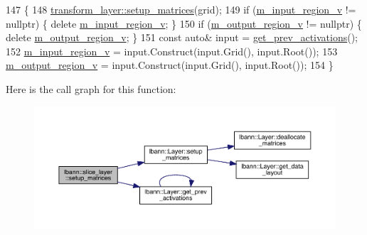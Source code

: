 \begin{DoxyCode}
147                                                    \{
148     \hyperlink{classlbann_1_1Layer_a57bbe21131dc00ab5cf9ea5e3656808e}{transform\_layer::setup\_matrices}(grid);
149     \textcolor{keywordflow}{if} (\hyperlink{classlbann_1_1slice__layer_a3e64f86a9e999d3d72867c6009aa99ba}{m\_input\_region\_v} != \textcolor{keyword}{nullptr})  \{ \textcolor{keyword}{delete} \hyperlink{classlbann_1_1slice__layer_a3e64f86a9e999d3d72867c6009aa99ba}{m\_input\_region\_v}; \}
150     \textcolor{keywordflow}{if} (\hyperlink{classlbann_1_1slice__layer_a9d72208fc8136641e91cb208c38f8b65}{m\_output\_region\_v} != \textcolor{keyword}{nullptr}) \{ \textcolor{keyword}{delete} 
      \hyperlink{classlbann_1_1slice__layer_a9d72208fc8136641e91cb208c38f8b65}{m\_output\_region\_v}; \}
151     \textcolor{keyword}{const} \textcolor{keyword}{auto}& input = \hyperlink{classlbann_1_1Layer_a45853df73a2e72bfaa774665a0f37ed7}{get\_prev\_activations}();
152     \hyperlink{classlbann_1_1slice__layer_a3e64f86a9e999d3d72867c6009aa99ba}{m\_input\_region\_v} = input.Construct(input.Grid(), input.Root());
153     \hyperlink{classlbann_1_1slice__layer_a9d72208fc8136641e91cb208c38f8b65}{m\_output\_region\_v} = input.Construct(input.Grid(), input.Root());
154   \}
\end{DoxyCode}
Here is the call graph for this function\+:\nopagebreak
\begin{figure}[H]
\begin{center}
\leavevmode
\includegraphics[width=350pt]{classlbann_1_1slice__layer_af3b6f79a53c9a80908b37c2587ff2cae_cgraph}
\end{center}
\end{figure}
\mbox{\label{classlbann_1_1slice__layer_a701854f5906a25c58d4f9d851b20de29}} 
